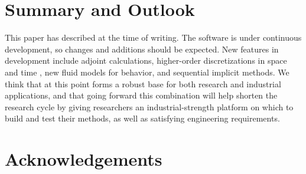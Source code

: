 



\section{Summary and Outlook}

This paper has described \opmflow at the time of writing. The software is under continuous
development, so changes and additions should be expected. New features in development
include adjoint calculations, higher-order discretizations in space and time
\cite{Kvashchuk:rsc19}, new fluid models for {\COto} behavior, and sequential implicit
methods.  We think that at this point \opm forms a robust base for both research and
industrial applications, and that going forward this combination will help shorten the
research cycle by giving researchers an industrial-strength platform on which to build and
test their methods, as well as satisfying engineering requirements.

\section{Acknowledgements}

